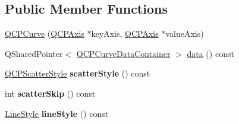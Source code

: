 \subsection*{Public Member Functions}
\begin{DoxyCompactItemize}
\item 
\hyperlink{class_q_c_p_curve_a36de58e2652b3fa47bdf9187d421d3ce}{Q\+C\+P\+Curve} (\hyperlink{class_q_c_p_axis}{Q\+C\+P\+Axis} $\ast$key\+Axis, \hyperlink{class_q_c_p_axis}{Q\+C\+P\+Axis} $\ast$value\+Axis)
\item 
Q\+Shared\+Pointer$<$ \hyperlink{class_q_c_p_data_container}{Q\+C\+P\+Curve\+Data\+Container} $>$ \hyperlink{class_q_c_p_curve_ad89c71fdd1726506c21c0cc471547368}{data} () const 
\item 
\hyperlink{class_q_c_p_scatter_style}{Q\+C\+P\+Scatter\+Style} {\bfseries scatter\+Style} () const \hypertarget{class_q_c_p_curve_a9ab864c9f6ba0cedf65853f59d867a68}{}\label{class_q_c_p_curve_a9ab864c9f6ba0cedf65853f59d867a68}

\item 
int {\bfseries scatter\+Skip} () const \hypertarget{class_q_c_p_curve_a3f79b67a8e6bd7d30403d802d39bbcf0}{}\label{class_q_c_p_curve_a3f79b67a8e6bd7d30403d802d39bbcf0}

\item 
\hyperlink{class_q_c_p_curve_a2710e9f79302152cff794c6e16cc01f1}{Line\+Style} {\bfseries line\+Style} () const \hypertarget{class_q_c_p_curve_a0314dd644258949aeb4a95cebde5abaf}{}\label{class_q_c_p_curve_a0314dd644258949aeb4a95cebde5abaf}


\end{DoxyCompactItemize}
